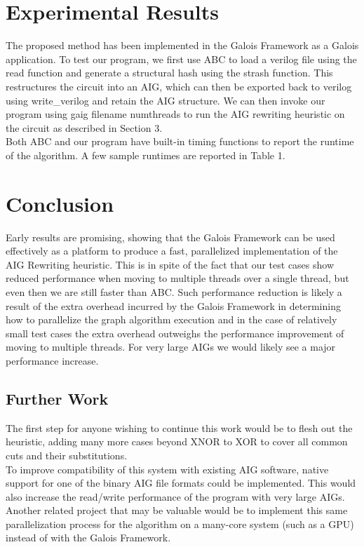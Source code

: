 \documentclass[twocolumn]{article}
\begin{document}
\section{Experimental Results}
The proposed method has been implemented in the Galois Framework\cite{GALOIS} as a Galois application. To test our program, we first use ABC to load a verilog file using the read function and generate a structural hash using the strash function. This restructures the circuit into an AIG, which can then be exported back to verilog using write\_verilog and retain the AIG structure.  We can then invoke our program using gaig filename numthreads to run the AIG rewriting heuristic on the circuit as described in Section 3. \\\indent
Both ABC and our program have built-in timing functions to report the runtime of the algorithm. A few sample runtimes are reported in Table 1.

\section{Conclusion}
Early results are promising, showing that the Galois Framework can be used effectively as a platform to produce a fast, parallelized implementation of the AIG Rewriting heuristic. This is in spite of the fact that our test cases show reduced performance when moving to multiple threads over a single thread, but even then we are still faster than ABC. Such performance reduction is likely a result of the extra overhead incurred by the Galois Framework in determining how to parallelize the graph algorithm execution and in the case of relatively small test cases the extra overhead outweighs the performance improvement of moving to multiple threads. For very large AIGs we would likely see a major performance increase.
\subsection{Further Work}
The first step for anyone wishing to continue this work would be to flesh out the heuristic, adding many more cases beyond XNOR to XOR to cover all common cuts and their substitutions.\\\indent
To improve compatibility of this system with existing AIG software, native support for one of the binary AIG file formats could be implemented. This would also increase the read/write performance of the program with very large AIGs.\\\indent
Another related project that may be valuable would be to implement this same parallelization process for the algorithm on a many-core system (such as a GPU) instead of with the Galois Framework.


\end{document}
